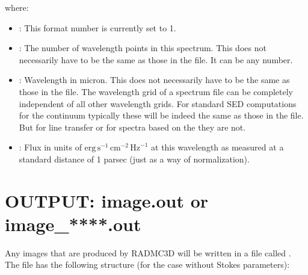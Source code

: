 \documentclass[letterpaper,10pt,english]{sphinxmanual}
\begin{document}
where:
\begin{itemize}
\item {} 
: This format number is currently set to 1.

\item {} 
: The number of wavelength points in this spectrum.
This does not necessarily have to be the same as those in the
 file. It can be any number.

\item {} 
: Wavelength in micron.  This does not necessarily
have to be the same as those in the  file.
The wavelength grid of a spectrum file can be completely independent
of all other wavelength grids. For standard SED computations for the
continuum typically these will be indeed the same as those in the
 file. But for line transfer or for
spectra based on the  they are
not.

\item {} 
: Flux in units of
\(\mathrm{erg}\,\mathrm{s}^{-1}\,\mathrm{cm}^{-2}\,\mathrm{Hz}^{-1}\)
at this
wavelength as measured at a standard distance of 1 parsec (just as a way
of normalization).

\end{itemize}



\section{OUTPUT: image.out or image\_****.out}
\label{\detokenize{inputoutputfiles:output-image-out-or-image-out}}\label{\detokenize{inputoutputfiles:sec-image-out}}
Any images that are produced by RADMC\sphinxhyphen{}3D will be written in a file called
. The file has the following structure (for the case
without Stokes parameters):
\end{document}

